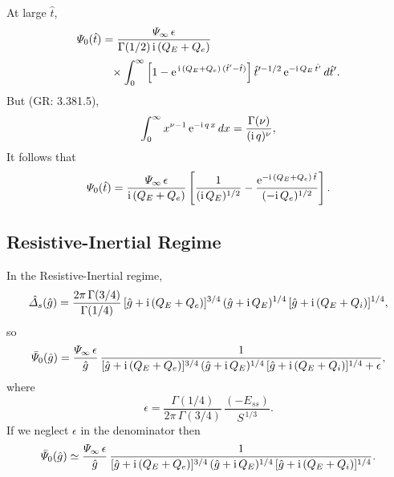 \documentclass[titlepage=false,12pt]{article}
\begin{document}
At large $\hat{t}$, 
\begin{align}
{\mit\Psi}_{0}(\hat{t}) &= \frac{{\mit\Psi}_\infty\,\epsilon}{\Gamma(1/2)\,{\rm i}\,(Q_E+Q_e)}\nonumber\\[0.5ex]
&\phantom{=}\times \int
_0^{\infty}\left[1-{\rm e}^{\,{\rm i}\,(Q_E+Q_e)\,(\hat{t}'-\hat{t})}\right]
\hat{t}'^{-1/2}\,{\rm e}^{-{\rm i}\,Q_E\,\hat{t'}}\,d\hat{t}'.
\end{align}
But (GR: 3.381.5), 
\begin{equation}
\int_0^\infty x^{\nu-1}\,{\rm e}^{-{\rm i}\,q\,x}\,dx = \frac{\Gamma(\nu)}{({\rm i}\,q)^{\nu}},
\end{equation}
It follows that
\begin{equation}
{\mit\Psi}_{0}(\hat{t}) = \frac{{\mit\Psi}_\infty\,\epsilon}{{\rm i}\,(Q_E+Q_e)}
\left[\frac{1}{({\rm i}\,Q_E)^{1/2}} - \frac{{\rm e}^{-{\rm i}\,(Q_E+Q_e)\,\hat{t}}}{(-{\rm i}\,Q_e)^{1/2}}\right].
\end{equation}

\subsection{Resistive-Inertial Regime}
In the Resistive-Inertial regime, 
\begin{equation}
\hat{\mit\Delta}_s(\hat{g}) = \frac{2\pi\,\Gamma(3/4)}{\Gamma(1/4)}\,[\hat{g}+{\rm i}\,(Q_E+Q_e)]^{3/4}\,(\hat{g}+{\rm i}\,Q_E)^{1/4}\,[\hat{g}+ {\rm i}\,(Q_E+Q_i)]^{1/4},
\end{equation}
so 
\begin{equation}
\bar{\mit\Psi}_{0}(\hat{g}) =\frac{{\mit\Psi}_\infty\,\epsilon}{\hat{g}}\,\frac{1}{[\hat{g}+{\rm i}\,(Q_E+Q_e)]^{3/4}\,(\hat{g}+{\rm i}\,Q_E)^{1/4}\,[\hat{g}+ {\rm i}\,(Q_E+Q_i)]^{1/4}
+\epsilon},
\end{equation}
where
\begin{equation}
\epsilon= \frac{\Gamma(1/4)}{2\pi\,\Gamma(3/4)}\,\frac{(-E_{ss})}{S^{\,1/3}}.
\end{equation}
If we neglect $\epsilon$ in the denominator then
\begin{equation}
\bar{\mit\Psi}_{0}(\hat{g}) \simeq\frac{{\mit\Psi}_\infty\,\epsilon}{\hat{g}}\,\frac{1}{[\hat{g}+{\rm i}\,(Q_E+Q_e)]^{3/4}\,(\hat{g}+{\rm i}\,Q_E)^{1/4}\,[\hat{g}+ {\rm i}\,(Q_E+Q_i)]^{1/4}}.
\end{equation}
\end{document}
